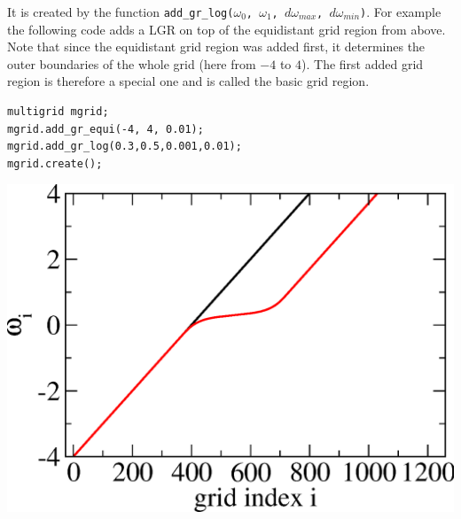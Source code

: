 It is created by the function \texttt{add\_gr\_log($\omega_0$, $\omega_1$, $d\omega_{max}$, $d\omega_{min}$)}. For example the following code adds a LGR on top of the equidistant grid region from above. Note that since the equidistant grid region was added first, it determines the outer boundaries of the whole grid (here from $-4$ to $4$). The first added grid region is therefore a special one and is called the basic grid region.
\\
\vspace{1cm}
\noindent\begin{minipage}[l]{0.6\textwidth}
\begin{lstlisting}
multigrid mgrid;
mgrid.add_gr_equi(-4, 4, 0.01);
mgrid.add_gr_log(0.3,0.5,0.001,0.01);
mgrid.create();
\end{lstlisting}
\end{minipage}
\begin{minipage}[]{0.4\textwidth}
	\includegraphics[width=1.0\textwidth]{pics/multigrid_01.eps}
\end{minipage}


